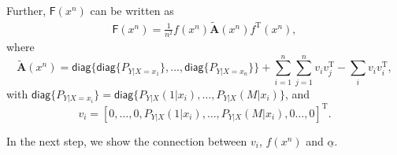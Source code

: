 \documentclass{article} %
\theoremstyle{plain} %
\begin{document}
Further, $\mathsf{F}(x^n)$ can be written as
\begin{align*}
    \mathsf{F}(x^n) = \frac1{n^2}f(x^n) \tilde{\mathbf{A}}(x^n)f^\mathrm{T}(x^n),
\end{align*}
where
\begin{equation*}
    \tilde{\mathbf{A}}(x^n) = \textsf{diag}\{\textsf{diag}\{P_{Y|X=x_1}\},\dots,\textsf{diag}\{P_{Y|X=x_n}\} \} + \sum_{i=1}^n\sum_{j=1}^n v_iv_j^\mathrm{T} - \sum_i v_iv_i^\mathrm{T},
\end{equation*}
with $\textsf{diag}\{P_{Y|X=x_i}\} = \textsf{diag}\{P_{Y|X}(1|x_i),\dots,P_{Y|X}(M|x_i)\}$, and
\begin{equation*}
    v_i = \left[0,\dots,0,P_{Y|X}(1|x_i),\dots, P_{Y|X}(M|x_i),0\dots,0\right]^\mathrm{T}.
\end{equation*}

In the next step, we show the connection between $v_i$, $f(x^n)$ and $\underline{\alpha}$.
\end{document}
